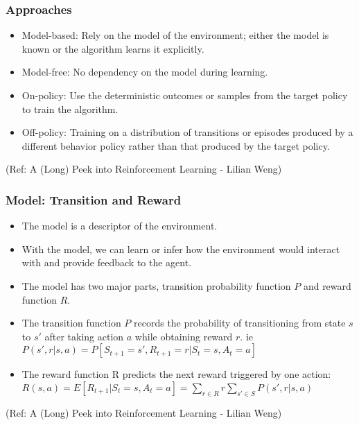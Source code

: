 \begin{frame}[fragile]\frametitle{Approaches}


\begin{itemize}
\item Model-based: Rely on the model of the environment; either the model is known or the algorithm learns it explicitly.
\item Model-free: No dependency on the model during learning.
\item On-policy: Use the deterministic outcomes or samples from the target policy to train the algorithm.
\item Off-policy: Training on a distribution of transitions or episodes produced by a different behavior
policy rather than that produced by the target policy.
\end{itemize}

{\tiny (Ref: A (Long) Peek into Reinforcement Learning - Lilian Weng)}


\end{frame}

\begin{frame}[fragile]\frametitle{Model: Transition and Reward}


\begin{itemize}
\item The model is a descriptor of the environment. 
\item With the model, we can learn or infer how the
environment would interact with and provide feedback to the agent. 
\item The model has two major parts, transition probability function $P$ and reward function $R$.
\item The transition function $P$ records the probability of transitioning from state $s$ to $s'$ after taking action $a$
while obtaining reward $r$. ie $P(s',r|s,a)=P[S_{t+1} = s',R_{t+1} = r|S_t = s, A_t = a]$
\item The reward function R predicts the next reward triggered by one action: $R(s,a) = E[R_{t+1} |S_t = s, A_t = a] = \sum_{r \in R} r \sum_{s' \in S}P(s',r|s,a)$
\end{itemize}

{\tiny (Ref: A (Long) Peek into Reinforcement Learning - Lilian Weng)}


\end{frame}

